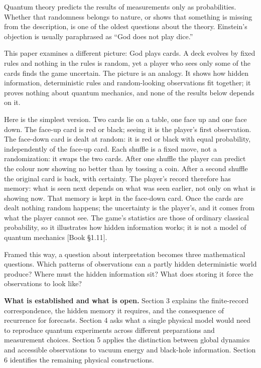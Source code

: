 \documentclass[
]{article}
\begin{document}
Quantum theory predicts the results of measurements only as
probabilities. Whether that randomness belongs to nature, or shows that
something is missing from the description, is one of the oldest
questions about the theory. Einstein's objection is usually paraphrased
as ``God does not play dice.''

This paper examines a different picture: God plays cards. A deck evolves
by fixed rules and nothing in the rules is random, yet a player who sees
only some of the cards finds the game uncertain. The picture is an
analogy. It shows how hidden information, deterministic rules and
random-looking observations fit together; it proves nothing about
quantum mechanics, and none of the results below depends on it.

Here is the simplest version. Two cards lie on a table, one face up and
one face down. The face-up card is red or black; seeing it is the
player's first observation. The face-down card is dealt at random: it is
red or black with equal probability, independently of the face-up card.
Each shuffle is a fixed move, not a randomization: it swaps the two
cards. After one shuffle the player can predict the colour now showing
no better than by tossing a coin. After a second shuffle the original
card is back, with certainty. The player's record therefore has memory:
what is seen next depends on what was seen earlier, not only on what is
showing now. That memory is kept in the face-down card. Once the cards
are dealt nothing random happens; the uncertainty is the player's, and
it comes from what the player cannot see. The game's statistics are
those of ordinary classical probability, so it illustrates how hidden
information works; it is not a model of quantum mechanics {[}Book
§1.11{]}.

Framed this way, a question about interpretation becomes three
mathematical questions. Which patterns of observations can a partly
hidden deterministic world produce? Where must the hidden information
sit? What does storing it force the observations to look like?

\textbf{What is established and what is open.} Section 3 explains the
finite-record correspondence, the hidden memory it requires, and the
consequence of recurrence for forecasts. Section 4 asks what a single
physical model would need to reproduce quantum experiments across
different preparations and measurement choices. Section 5 applies the
distinction between global dynamics and accessible observations to
vacuum energy and black-hole information. Section 6 identifies the
remaining physical constructions.
\end{document}
